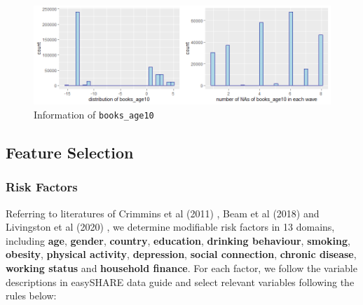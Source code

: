 \documentclass[11pt,twoside]{article}
\numberwithin{Theorem}{section}
\numberwithin{Definition}{section}
\numberwithin{Lemma}{section}
\numberwithin{Algorithm}{section}
\numberwithin{equation}{section}
\begin{document}
\begin{figure}[!h]
	\centering
	\includegraphics[width = 0.75 \textwidth]{Images/books_age10.png}
	\caption{Information of  \texttt{books\_age10}}
	\label{fig:books_age10}
\end{figure}

\subsection{Feature Selection}

\subsubsection{Risk Factors}

Referring to literatures of Crimmins et al (2011) \cite{crimmins2011assessment}, Beam et al (2018) \cite{beam2018differences} and Livingston et al (2020) \cite{livingston2017dementia}, we determine modifiable risk factors in 13 domains, including \textbf{age},  \textbf{gender}, \textbf{country}, \textbf{education}, \textbf{drinking behaviour}, \textbf{smoking}, \textbf{obesity}, \textbf{physical activity}, \textbf{depression}, \textbf{social connection}, \textbf{chronic disease}, \textbf{working status} and \textbf{household finance}. For each factor, we follow the variable descriptions in easySHARE data guide \cite{gruber2014generating} and select relevant variables following the rules below:
\end{document}
